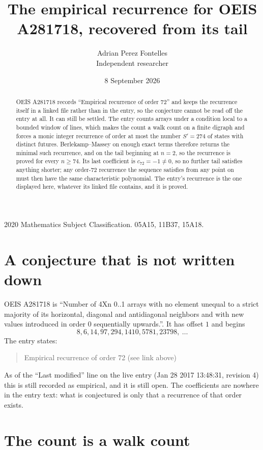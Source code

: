 \documentclass[11pt,a4paper]{article}
\title{The empirical recurrence for OEIS A281718, recovered from its tail}
\author{Adrian Perez Fontelles\\ \small Independent researcher}
\date{8 September 2026}
\theoremstyle{plain}
\theoremstyle{definition}
\begin{document}
\maketitle

\begin{abstract}
OEIS A281718 records ``Empirical recurrence of order $72$'' and keeps the recurrence itself in
a linked file rather than in the entry, so the conjecture cannot be read off the entry at all.
It can still be settled. The entry counts arrays under a condition local to a bounded window of
lines, which makes the count a walk count on a finite digraph and forces a monic integer
recurrence of order at most the number $S'=274$ of states with distinct futures. Berlekamp--Massey on
enough exact terms therefore returns the minimal such recurrence, and on the tail beginning at $n=2$, so the recurrence is proved for every $n\ge74$.
Its last coefficient is $c_{72}=-1\neq0$, so no further tail satisfies anything
shorter; any order-$72$ recurrence the sequence satisfies from any point on must then have
the same characteristic polynomial. The entry's recurrence is the one displayed here, whatever
its linked file contains, and it is proved.
\end{abstract}

\noindent\small 2020 Mathematics Subject Classification. 05A15, 11B37, 15A18.\normalsize

\section{A conjecture that is not written down}

OEIS A281718 is ``Number of 4Xn 0..1 arrays with no element unequal to a strict majority of its horizontal, diagonal and antidiagonal neighbors and with new values introduced in order 0 sequentially upwards.''. It has offset $1$ and begins
\[
8, 6, 14, 97, 294, 1410, 5781, 23798,\ \dots
\]
The entry states:
\begin{quote}
Empirical recurrence of order 72 (see link above)
\end{quote}
As of the ``Last modified'' line on the live entry (Jan 28 2017 13:48:31, revision 4)
this is still recorded as empirical, and it is still open. The coefficients are nowhere in the
entry text: what is conjectured is only that a recurrence of that order exists.

\section{The count is a walk count}
\end{document}
